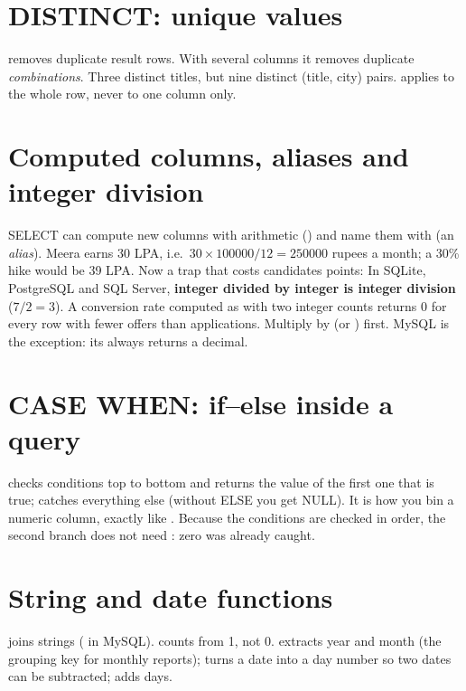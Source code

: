 \section{DISTINCT: unique values}
 removes duplicate result rows. With several columns it removes duplicate \emph{combinations}.
Three distinct titles, but nine distinct (title, city) pairs.  applies to the whole row, never to one column only.

\section{Computed columns, aliases and integer division}
SELECT can compute new columns with arithmetic (\code{+ - * /}) and name them with  (an \emph{alias}).
Meera earns 30 LPA, i.e.\ $30 \times 100000 / 12 = 250000$ rupees a month; a 30\% hike would be 39 LPA. Now a trap that costs candidates points:
In SQLite, PostgreSQL and SQL Server, \textbf{integer divided by integer is integer division} ($7/2 = 3$). A conversion rate computed as
 with two integer counts returns 0 for every row with fewer offers than applications. Multiply by  (or
) first. MySQL is the exception: its \code{/} always returns a decimal.

\section{CASE WHEN: if--else inside a query}
 checks conditions top to bottom and returns the value of the first one that is true;  catches everything else (without ELSE you get
NULL). It is how you bin a numeric column, exactly like .
Because the conditions are checked in order, the second branch  does not need : zero was already caught.

\section{String and date functions}
\code{||} joins strings ( in MySQL).  counts from 1, not 0.
 extracts year and month (the grouping key for monthly reports);  turns a date into a day number so two dates
can be subtracted;  adds days.


